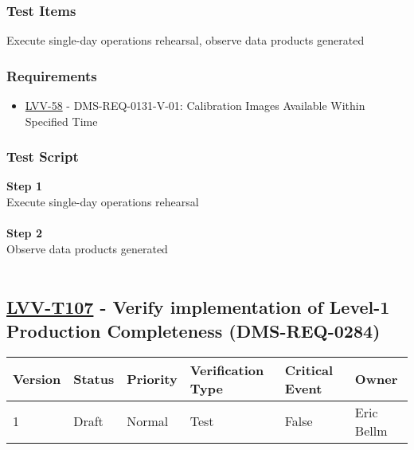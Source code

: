 \hypertarget{test-items-82}{%
\subsubsection{Test Items}\label{test-items-82}}

Execute single-day operations rehearsal, observe data products generated

\hypertarget{requirements-83}{%
\subsubsection{Requirements}\label{requirements-83}}

\begin{itemize}
\tightlist
\item
  \href{https://jira.lsstcorp.org/browse/LVV-58}{LVV-58} -
  DMS-REQ-0131-V-01: Calibration Images Available Within Specified Time
\end{itemize}

\hypertarget{test-script-83}{%
\subsubsection{Test Script}\label{test-script-83}}

\textbf{Step 1}\\
Execute single-day operations rehearsal\\
~\\
\textbf{Step 2}\\
\hspace*{0.333em}Observe data products generated\\
~\\

\hypertarget{lvv-t107---verify-implementation-of-level-1-production-completeness-dms-req-0284}{%
\subsection{\texorpdfstring{\href{https://jira.lsstcorp.org/secure/Tests.jspa\#/testCase/LVV-T107}{LVV-T107}
- Verify implementation of Level-1 Production Completeness
(DMS-REQ-0284)}{LVV-T107 - Verify implementation of Level-1 Production Completeness (DMS-REQ-0284)}}\label{lvv-t107---verify-implementation-of-level-1-production-completeness-dms-req-0284}}

\begin{longtable}[]{@{}llllll@{}}
\toprule
Version & Status & Priority & Verification Type & Critical Event &
Owner\tabularnewline
\midrule
\endhead
1 & Draft & Normal & Test & False & Eric Bellm\tabularnewline
\bottomrule
\end{longtable}

